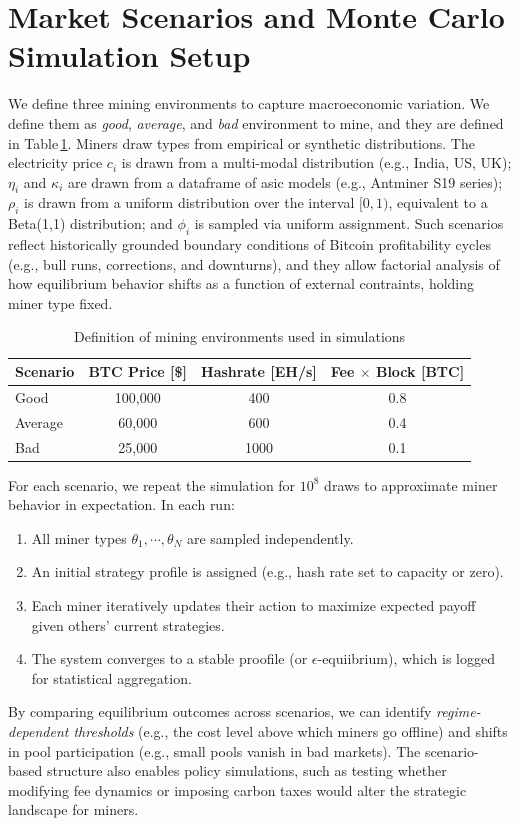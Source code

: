\documentclass[12pt]{article}
\begin{document}
\section{Market Scenarios and Monte Carlo Simulation Setup}
We define three mining environments to capture macroeconomic variation. We define them as \emph{good}, \emph{average}, and \emph{bad} environment to mine, and they are defined in Table\,\ref{tab:mining-envs}. Miners draw types from empirical or synthetic distributions. The electricity price $c_i$ is drawn from a multi-modal distribution (e.g., India, US, UK); $\eta_i$ and $\kappa_i$ are drawn from a dataframe of \gls{asic} models (e.g., Antminer S19 series); $\rho_i$ is drawn from a uniform distribution over the interval $[0,1)$, equivalent to a Beta(1,1) distribution; and $\phi_i$ is sampled via uniform assignment. Such scenarios reflect historically grounded boundary conditions of Bitcoin profitability cycles (e.g., bull runs, corrections, and downturns), and they allow factorial analysis of how equilibrium behavior shifts as a function of external contraints, holding miner type fixed.
\begin{table}[ht]
	\centering
	\begin{tabular}{|l|c|c|c|}
		\hline
		\textbf{Scenario} & \textbf{BTC Price [\$]} & \textbf{Hashrate [EH/s]} & \textbf{Fee $\times$ Block [BTC]} \\
		\hline
		Good     & 100{,}000  & 400  & 0.8 \\
		Average  & 60{,}000   & 600  & 0.4 \\
		Bad      & 25{,}000   & 1000\protect\footnotemark  & 0.1 \\
		\hline
	\end{tabular}
	\caption{Definition of mining environments used in simulations}
	\label{tab:mining-envs}
\end{table}

For each scenario, we repeat the simulation for $10^8$ draws to approximate miner behavior in expectation. In each run:
\begin{enumerate}
	\item All miner types $\theta_1, \cdots, \theta_N$ are sampled independently.
	\item An initial strategy profile is assigned (e.g., hash rate set to capacity or zero).
	\item Each miner iteratively updates their action to maximize expected payoff given others' current strategies.
	\item The system converges to a stable proofile (or $\epsilon$-equiibrium), which is logged for statistical aggregation.
\end{enumerate}
By comparing equilibrium outcomes across scenarios, we can identify \emph{regime-dependent thresholds} (e.g., the cost level above which miners go offline) and shifts in pool participation (e.g., small pools vanish in bad markets). The scenario-based structure also enables policy simulations, such as testing whether modifying fee dynamics or imposing carbon taxes would alter the strategic landscape for miners.
\end{document}
